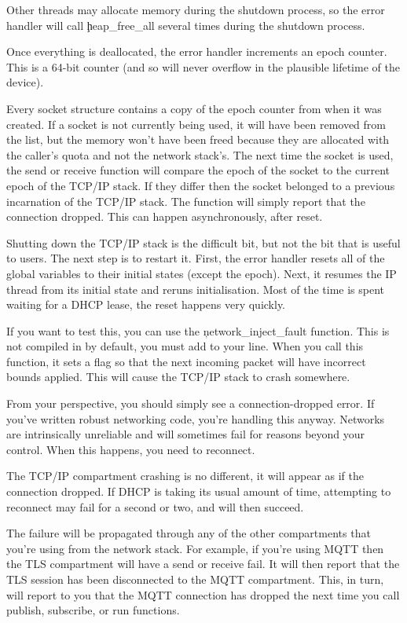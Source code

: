 Other threads may allocate memory during the shutdown process, so the error handler will call \c{heap_free_all} several times during the shutdown process.

Once everything is deallocated, the error handler increments an epoch counter.
This is a 64-bit counter (and so will never overflow in the plausible lifetime of the device).

Every socket structure contains a copy of the epoch counter from when it was created.
If a socket is not currently being used, it will have been removed from the list, but the memory won't have been freed because they are allocated with the caller's quota and not the network stack's.
The next time the socket is used, the send or receive function will compare the epoch of the socket to the current epoch of the TCP/IP stack.
If they differ then the socket belonged to a previous incarnation of the TCP/IP stack.
The function will simply report that the connection dropped.
This can happen asynchronously, after reset.

Shutting down the TCP/IP stack is the difficult bit, but not the bit that is useful to users.
The next step is to restart it.
First, the error handler resets all of the global variables to their initial states (except the epoch).
Next, it resumes the IP thread from its initial state and reruns initialisation.
Most of the time is spent waiting for a DHCP lease, the reset happens very quickly.

If you want to test this, you can use the \c{network_inject_fault} function.
This is not compiled in by default, you must add  to your   line.
When you call this function, it sets a flag so that the next incoming packet will have incorrect bounds applied.
This will cause the TCP/IP stack to crash somewhere.


From your perspective, you should simply see a connection-dropped error.
If you've written robust networking code, you're handling this anyway.
Networks are intrinsically unreliable and will sometimes fail for reasons beyond your control.
When this happens, you need to reconnect.

The TCP/IP compartment crashing is no different, it will appear as if the connection dropped.
If DHCP is taking its usual amount of time, attempting to reconnect may fail for a second or two, and will then succeed.

The failure will be propagated through any of the other compartments that you're using from the network stack.
For example, if you're using MQTT then the TLS compartment will have a send or receive fail.
It will then report that the TLS session has been disconnected to the MQTT compartment.
This, in turn, will report to you that the MQTT connection has dropped the next time you call publish, subscribe, or run functions.

